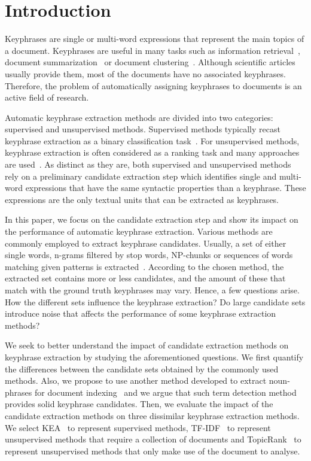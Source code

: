 \section{Introduction}
\label{sec:section}
  Keyphrases are single or multi-word expressions that represent the main topics
  of a document. Keyphrases are useful in many tasks such as information
  retrieval~\cite{medelyan2008smalltrainingset}, document
  summarization~\cite{litvak2008graphbased} or document
  clustering~\cite{han2007webdocumentclustering}. Although scientific articles
  usually provide them, most of the documents have no associated keyphrases.
  Therefore, the problem of automatically assigning keyphrases to documents is
  an active field of research.

  Automatic keyphrase extraction methods are divided into two categories:
  supervised and unsupervised methods. Supervised methods typically recast
  keyphrase extraction as a binary classification
  task~\cite{witten1999kea,sujian2003maximumentropy,eichler2010keywe}. For
  unsupervised methods, keyphrase extraction is often considered as a ranking
  task and many approaches are
  used~\cite{barker2000nounphrasehead,tomokiyo2003languagemodel,mihalcea2004textrank}.
  As distinct as they are, both supervised and unsupervised methods rely on a
  preliminary candidate extraction step which identifies single and multi-word
  expressions that have the same syntactic properties than a keyphrase. These
  expressions are the only textual units that can be extracted as keyphrases.
  
  In this paper, we focus on the candidate extraction step and show its impact
  on the performance of automatic keyphrase extraction. Various methods
  are commonly employed to extract keyphrase candidates. Usually, a set of
  either single words, n-grams filtered by stop words, NP-chunks or sequences of
  words matching given patterns is extracted~\cite{hulth2003keywordextraction}.
  According to the chosen method, the extracted set contains more or less
  candidates, and the amount of these that match with the ground truth
  keyphrases may vary. Hence, a few questions arise. How the different sets
  influence the keyphrase extraction? Do large candidate sets introduce noise
  that affects the performance of some keyphrase extraction methods?

  We seek to better understand the impact of candidate extraction methods on
  keyphrase extraction by studying the aforementioned questions. We first
  quantify the differences between the candidate sets obtained by the commonly
  used methods. Also, we propose to use another method developed to extract
  noun-phrases for document indexing~\cite{evans1996nounphraseanalysis} and we
  argue that such term detection
  method~\cite{castellvi2001automatictermdetection} provides solid keyphrase
  candidates. Then, we evaluate the impact of the candidate extraction methods
  on three dissimilar keyphrase extraction methods. We select
  KEA~\cite{witten1999kea} to represent supervised methods,
  TF-IDF~\cite{jones1972tfidf} to represent unsupervised methods that require a
  collection of documents and TopicRank~\cite{bougouin2013topicrank} to
  represent unsupervised methods that only make use of the document to analyse.

